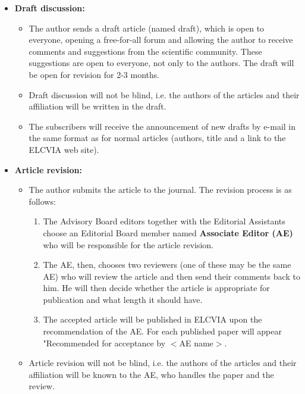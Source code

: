 \documentclass[twoside,a4paper,11pt]{article}
\begin{document}
\begin{itemize}
\item {\bf Draft discussion:}

\begin{itemize}
\item The author sends a draft article (named draft), which is open
to everyone, opening a free-for-all forum and allowing the author
to receive comments and suggestions from the scientific community.
These suggestions are open to everyone, not only to the authors.
The draft will be open for revision for 2-3 months.

\item Draft discussion will not be blind, i.e. the authors of the 
articles  and their affiliation will be written in the draft. 

\item The subscribers will receive the announcement of new drafts
by e-mail in the same format as for normal articles (authors,
title and a link to the ELCVIA web site).
\end{itemize}

\item {\bf Article revision:}

\begin{itemize}
\item The author submits the article to the journal. The revision
process is as follows:

\begin{enumerate}

\item The Advisory Board editors together with the Editorial
Assistants choose an Editorial Board member named {\bf Associate Editor (AE)}
who will be responsible for the article revision.

\item The AE, then, chooses two reviewers (one of these may be the same AE) who
will review the article and then send their comments back to him.
He will then decide whether the article is appropriate for publication
and what length it should have.

\item The accepted article will be published in ELCVIA upon the
recommendation of the AE. For each published
paper will appear "Recommended for acceptance by $<$AE name$>$.

\end{enumerate}

\item Article revision will not be blind, i.e. the authors of the articles 
and their affiliation will be known to the AE, who handles the paper and 
the review.

\end{itemize}
\end{itemize}
\end{document}
